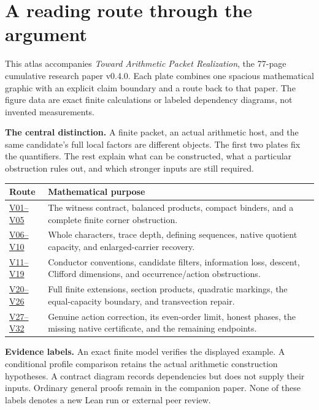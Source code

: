 \documentclass[11pt]{article}
\begin{document}
\KomorebiCover
{}
\section*{A reading route through the argument}
This atlas accompanies \emph{Toward Arithmetic Packet Realization}, the 77-page cumulative research paper v0.4.0. Each plate combines one spacious mathematical graphic with an explicit claim boundary and a route back to that paper. The figure data are exact finite calculations or labeled dependency diagrams, not invented measurements.

\textbf{The central distinction.} A finite packet, an actual arithmetic host, and the same candidate's full local factors are different objects. The first two plates fix the quantifiers. The rest explain what can be constructed, what a particular obstruction rules out, and which stronger inputs are still required.

\begin{center}\renewcommand{\arraystretch}{1.6}
\begin{tabular}{@{}p{.15\linewidth}p{.76\linewidth}@{}}\toprule
Route & Mathematical purpose\\\midrule
\hyperref[plate:V01]{V01--V05} & The witness contract, balanced products, compact binders, and a complete finite corner obstruction.\\
\hyperref[plate:V06]{V06--V10} & Whole characters, trace depth, defining sequences, native quotient capacity, and enlarged-carrier recovery.\\
\hyperref[plate:V11]{V11--V19} & Conductor conventions, candidate filters, information loss, descent, Clifford dimensions, and occurrence/action obstructions.\\
\hyperref[plate:V20]{V20--V26} & Full finite extensions, section products, quadratic markings, the equal-capacity boundary, and transvection repair.\\
\hyperref[plate:V27]{V27--V32} & Genuine action correction, its even-order limit, honest phases, the missing native certificate, and the remaining endpoints.\\\bottomrule
\end{tabular}\end{center}

\textbf{Evidence labels.} An exact finite model verifies the displayed example. A conditional profile comparison retains the actual arithmetic construction hypotheses. A contract diagram records dependencies but does not supply their inputs. Ordinary general proofs remain in the companion paper. None of these labels denotes a new Lean run or external peer review.
\end{document}
